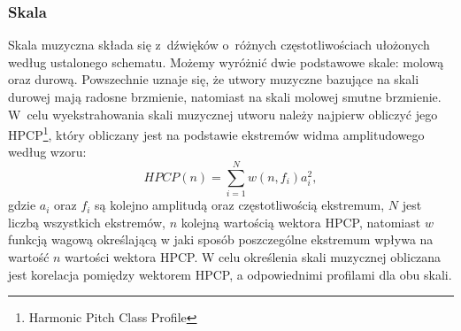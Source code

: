 \subsubsection{Skala}
Skala muzyczna składa się z~dźwięków o~różnych częstotliwościach ułożonych według ustalonego schematu. Możemy wyróżnić dwie podstawowe skale: molową oraz durową. Powszechnie uznaje się, że utwory muzyczne bazujące na skali durowej mają radosne brzmienie, natomiast na skali molowej smutne brzmienie\cite{skala}. W~celu wyekstrahowania skali muzycznej utworu należy najpierw obliczyć jego HPCP\footnote{Harmonic Pitch Class Profile}, który obliczany jest na podstawie ekstremów widma amplitudowego według wzoru:
\begin{equation}
HPCP(n) = \sum^{N}_{i=1} w(n,f_i)a_i ^2,
\end{equation}
gdzie $a_i$ oraz $f_i$ są kolejno amplitudą oraz częstotliwością ekstremum, $N$ jest liczbą wszystkich ekstremów, $n$ kolejną wartością wektora HPCP, natomiast $w$ funkcją wagową określającą w jaki sposób poszczególne ekstremum wpływa na wartość $n$ wartości wektora HPCP. W celu określenia skali muzycznej obliczana jest korelacja pomiędzy wektorem HPCP, a odpowiednimi profilami dla obu skali\cite{hpcp}.










    
